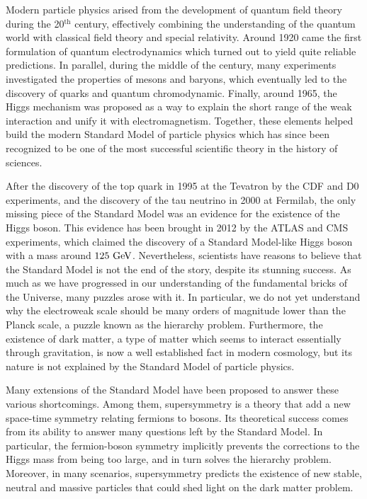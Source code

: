 Modern particle physics arised from the development of quantum field theory during
the 20$^\text{th}$ century, effectively combining the understanding of the
quantum world with classical field theory and special relativity. Around 1920 came the first
formulation of quantum electrodynamics which turned out to yield quite reliable predictions.
In parallel, during the middle of the century, many experiments investigated the properties
of mesons and baryons, which eventually led to the discovery of quarks and quantum chromodynamic.
Finally, around 1965, the Higgs mechanism was proposed as a way to explain the short range
of the weak interaction and unify it with electromagnetism. Together, these elements helped
build the modern Standard Model of particle physics which has since been recognized to be
one of the most successful scientific theory in the history of sciences.

After the discovery of the top quark in 1995 at the Tevatron by the CDF and D0 experiments,
and the discovery of the tau neutrino in 2000 at Fermilab,
the only missing piece of the Standard Model was an evidence for the existence of the Higgs
boson. This evidence has been brought in 2012 by the ATLAS and CMS experiments,
which claimed the discovery of a Standard Model-like Higgs boson with a mass around
$125~\text{GeV}$. Nevertheless, scientists have reasons to believe that the Standard Model is not
the end of the story, despite its stunning success. As much as we have progressed in our
understanding of the fundamental bricks of the Universe, many puzzles arose with it. In
particular, we do not yet understand why the electroweak scale should be many orders of
magnitude lower than the Planck scale, a puzzle known as the hierarchy
problem. Furthermore, the existence of dark matter, a type of matter which seems to interact
essentially through gravitation, is now a well established fact in modern cosmology, but
its nature is not explained by the Standard Model of particle physics.

Many extensions of the Standard Model have been proposed to answer these various shortcomings.
Among them, supersymmetry is a theory that add a new space-time symmetry relating fermions
to bosons. Its theoretical success comes from its ability to answer many questions left by the
Standard Model. In particular, the fermion-boson symmetry implicitly prevents the corrections
to the Higgs mass from being too large, and in turn solves the hierarchy problem.
Moreover, in many scenarios, supersymmetry predicts the existence of new stable, neutral
and massive particles that could shed light on the dark matter problem.

